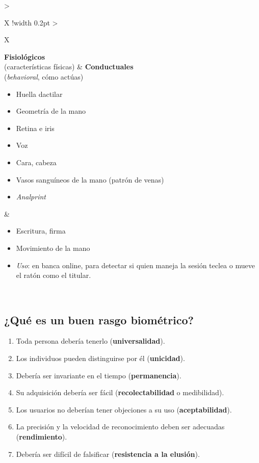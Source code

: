 \documentclass[11pt,a4paper]{report}
\begin{document}
\begin{center}
\small
{\setlength{\aboverulesep}{0pt}\setlength{\belowrulesep}{0pt}\renewcommand{\arraystretch}{1.3}%
\begin{tabularx}{\linewidth}{>{\raggedright\arraybackslash}X !{\color{gray!45}\vrule width 0.2pt} >{\raggedright\arraybackslash}X}
\toprule
\centering\textbf{Fisiológicos}\\\centering(características físicas) & \centering\arraybackslash\textbf{Conductuales}\\\centering\arraybackslash(\emph{behavioral}, cómo actúas) \\
\midrule
\vspace{-0.5\baselineskip}\begin{itemize}[leftmargin=*,nosep,topsep=0pt]
  \item Huella dactilar
  \item Geometría de la mano
  \item Retina e iris
  \item Voz
  \item Cara, cabeza
  \item Vasos sanguíneos de la mano (patrón de venas)
  \item \emph{Analprint}
\end{itemize}\vspace{2pt}
&
\vspace{-0.5\baselineskip}\begin{itemize}[leftmargin=*,nosep,topsep=0pt]
  \item Escritura, firma
  \item Movimiento de la mano
  \item \textit{Uso}: en banca online, para detectar si quien maneja la sesión teclea o mueve el ratón como el titular.
\end{itemize}\vspace{2pt} \\
\bottomrule
\end{tabularx}}
\end{center}
 
\subsection{¿Qué es un buen rasgo biométrico?}
\begin{enumerate}
  \item Toda persona debería tenerlo (\textbf{universalidad}).
  \item Los individuos pueden distinguirse por él (\textbf{unicidad}).
  \item Debería ser invariante en el tiempo (\textbf{permanencia}).
  \item Su adquisición debería ser fácil (\textbf{recolectabilidad} o medibilidad).
  \item Los usuarios no deberían tener objeciones a su uso (\textbf{aceptabilidad}).
  \item La precisión y la velocidad de reconocimiento deben ser adecuadas (\textbf{rendimiento}).
  \item Debería ser difícil de falsificar (\textbf{resistencia a la elusión}).
\end{enumerate}
 
\end{document}
